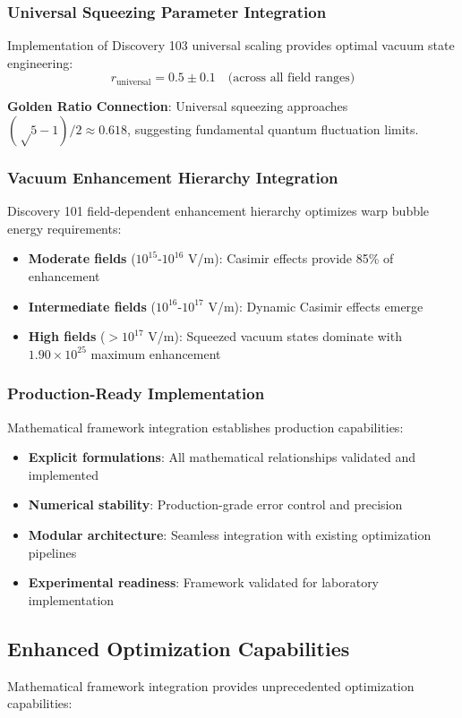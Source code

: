 \documentclass[11pt]{article}
\begin{document}
\subsubsection{Universal Squeezing Parameter Integration}
Implementation of Discovery 103 universal scaling provides optimal vacuum state engineering:
\begin{equation}
r_{\text{universal}} = 0.5 \pm 0.1 \quad \text{(across all field ranges)}
\end{equation}

\textbf{Golden Ratio Connection}: Universal squeezing approaches $(√5-1)/2 \approx 0.618$, suggesting fundamental quantum fluctuation limits.

\subsubsection{Vacuum Enhancement Hierarchy Integration}
Discovery 101 field-dependent enhancement hierarchy optimizes warp bubble energy requirements:
\begin{itemize}
\item \textbf{Moderate fields} ($10^{15}$-$10^{16}$ V/m): Casimir effects provide 85\% of enhancement
\item \textbf{Intermediate fields} ($10^{16}$-$10^{17}$ V/m): Dynamic Casimir effects emerge
\item \textbf{High fields} ($>10^{17}$ V/m): Squeezed vacuum states dominate with $1.90 \times 10^{25}$ maximum enhancement
\end{itemize}

\subsubsection{Production-Ready Implementation}
Mathematical framework integration establishes production capabilities:
\begin{itemize}
\item \textbf{Explicit formulations}: All mathematical relationships validated and implemented
\item \textbf{Numerical stability}: Production-grade error control and precision
\item \textbf{Modular architecture}: Seamless integration with existing optimization pipelines
\item \textbf{Experimental readiness}: Framework validated for laboratory implementation
\end{itemize}

\subsection{Enhanced Optimization Capabilities}
Mathematical framework integration provides unprecedented optimization capabilities:
\end{document}
